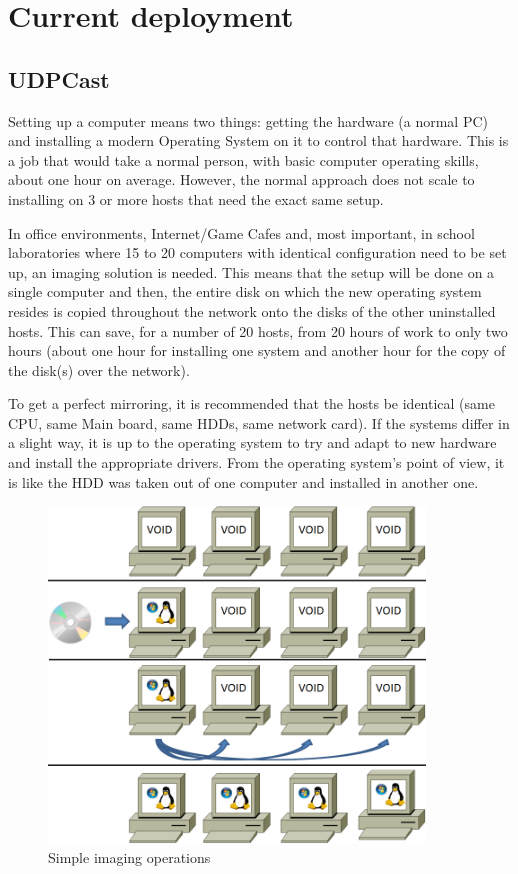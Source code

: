 
\chapter{Current deployment}\label{ch:current}
\bigskip

\section{UDPCast}


Setting up a computer means two things: getting the hardware (a normal
PC) and installing a modern Operating System on it to control that
hardware. This is a job that would take a normal person, with basic
computer operating skills, about one hour on average. However, the
normal approach does not scale to installing on 3 or more hosts that
need the exact same setup.


In office environments, Internet/Game Cafes and, most important, in
school laboratories where 15 to 20 computers with identical
configuration need to be set up, an imaging solution is needed.  This
means that the setup will be done on a single computer and then, the
entire disk on which the new operating system resides is copied
throughout the network onto the disks of the other uninstalled hosts.
This can save, for a number of 20 hosts, from 20 hours of work to only
two hours (about one hour for installing one system and another hour
for the copy of the disk(s) over the network).


To get a perfect mirroring, it is recommended that the hosts be
identical (same CPU, same Main board, same \ac{HDD}s, same network card).
If the systems differ in a slight way, it is up to the operating
system to try and adapt to new hardware and install the appropriate
drivers.  From the operating system’s point of view, it is like the
HDD was taken out of one computer and installed in another one.

\begin{figure}[h]
\includegraphics[width=10cm]{img/4comp}
\caption{Simple imaging operations}
\label{fig:4comp}
\end{figure}


